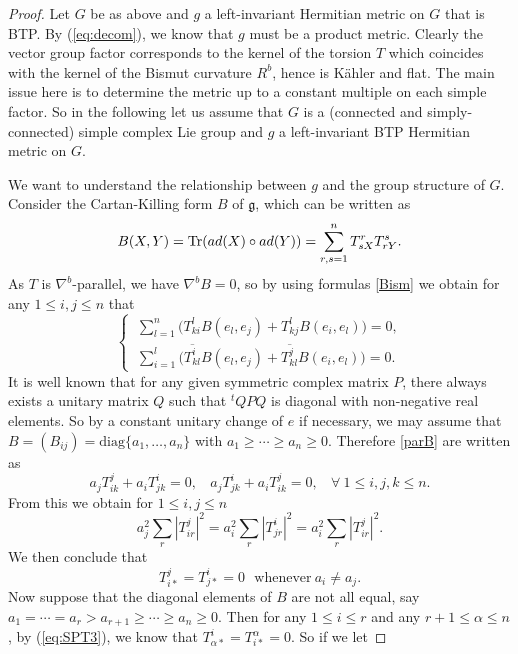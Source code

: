 \documentclass{amsart}
\numberwithin{equation}{section}
\theoremstyle{definition}
\renewcommand{\1}{\mathds{1}}
\renewcommand{\gg}{\mathfrak g}
\newcommand{\ad}{\rm {ad}}
\renewcommand{\>}{\rightarrow}
\begin{document}
\begin{proof} Let $G$ be as above and $g$ a left-invariant Hermitian metric on $G$ that is {\rm BTP}. By (\ref{eq:decom}), we know that $g$ must be a product metric. Clearly the vector group factor corresponds to the kernel of the torsion $T$ which coincides with the kernel of the Bismut curvature $R^b$, hence is K\"ahler and flat. The main issue here is to determine the metric up to a constant multiple on each simple factor. So in the following let us assume that $G$ is a (connected and simply-connected) simple complex Lie group and $g$ a left-invariant {\rm BTP} Hermitian metric on $G$.

We want to understand the relationship between $g$ and the group structure of $G$.  Consider the Cartan-Killing form $B$ of $\gg$, which can be written as
\begin{equation} \label{eq:Killing}
B(X,Y) = \mbox{Tr}(\ad(X)\circ\ad(Y)) =  \sum_{r,s=1}^n T^r_{sX} T^s_{rY}.
\end{equation}
As $T$ is $\nabla^b$-parallel, we have $\nabla^bB =0$, so by using formulas \eqref{Bism} we obtain for any $1\leq i,j\leq n$ that
\begin{equation}\label{parB}
\left\{ \begin{split} \  \sum_{l=1}^n \big(  T^l_{ki}B(e_l,e_j) + T^l_{kj}B(e_i,e_l) \big) = 0,\\
\ \sum_{i=1}^l\big( \overline{T^i_{kl}}B(e_l,e_j) + \overline{T^j_{kl}}B(e_i,e_l)\big)  =0.
\end{split} \right.
\end{equation}
It is well known that for any given symmetric complex matrix $P$, there always exists a unitary matrix $Q$ such that $^t\!Q P Q $ is diagonal with non-negative real elements. So by a constant unitary change of $e$ if necessary, we may assume that $B= (B_{ij}) =\mbox{diag} \{ a_1, \ldots , a_n\}$ with $a_1\geq \cdots \geq a_n\geq 0$. Therefore \eqref{parB} are written as
\begin{equation*}
a_jT^j_{ik} + a_iT^i_{jk} =0 , \ \ \ \ a_jT^i_{jk} + a_iT^j_{ik} =0 , \ \ \ \ \forall \ 1\leq i,j,k\leq n.
\end{equation*}
From this we obtain for $1\leq i,j\leq n$
$$a_j^2\sum_r |T^j_{ir}|^2 = a_i^2 \sum_r |T^i_{jr}|^2 = a_i^2 \sum_r |T^j_{ir}|^2.$$
We then conclude that
\begin{equation} \label{eq:SPT3}
T^j_{i\ast} = T^i_{j\ast} =0  \ \ \ \mbox{whenever} \ a_i\neq a_j.
\end{equation}
Now suppose that the diagonal elements of $B$ are not all equal, say $a_1=\cdots =a_r > a_{r+1} \geq \cdots \geq a_n\geq 0$. Then for any $1\leq i\leq r$ and any $r+1\leq \alpha \leq n$, by (\ref{eq:SPT3}), we know that $T^i_{\alpha \ast } = T^{\alpha}_{i\ast}=0$. So if we let

\end{proof}
\end{document}
